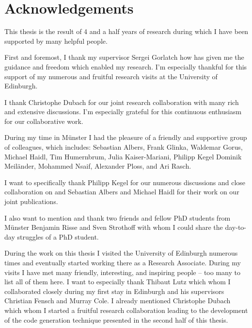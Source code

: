 

\begingroup

\let\clearpage\relax
\let\cleardoublepage\relax
\let\cleardoublepage\relax

\chapter*{Acknowledgements} %

This thesis is the result of 4 and a half years of research during which I have been supported by many helpful people.

First and foremost, I thank my supervisor Sergei Gorlatch how has given me the guidance and freedom which enabled my research.
I'm especially thankful for this support of my numerous and fruitful research visits at the University of Edinburgh.

I thank Christophe Dubach for our joint research collaboration with many rich and extensive discussions.
I'm especially grateful for this continuous enthusiasm for our collaborative work.

During my time in M{\"u}nster I had the pleasure of a friendly and supportive group of colleagues, which includes:
Sebastian Albers,
Frank Glinka,
Waldemar Gorus,
Michael Haidl,
Tim Humernbrum,
Julia Kaiser-Mariani,
Philipp Kegel
Dominik Meil{\"a}nder,
Mohammed Nsaif,
Alexander Ploss,
and
Ari Rasch.

I want to specifically thank Philipp Kegel for our numerous discussions and close collaboration on \SkelCL and Sebastian Albers and Michael Haidl for their work on our joint publications.

I also want to mention and thank two friends and fellow PhD students from M{\"u}nster Benjamin Risse and Sven Strothoff with whom I could share the day-to-day struggles of a PhD student.

During the work on this thesis I visited the University of Edinburgh numerous times and eventually started working there as a Research Associate.
During my visits I have met many friendly, interesting, and inspiring people -- too many to list all of them here.
I want to especially thank Thibaut Lutz which whom I collaborated closely during my first stay in Edinburgh and his supervisors Christian Fensch and Murray Cole.
I already mentioned Christophe Dubach which whom I started a fruitful research collaboration leading to the development of the code generation technique presented in the second half of this thesis.

